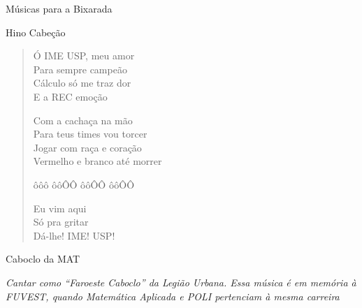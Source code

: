 \begin{secao}{Músicas para a Bixarada}

\begin{subsecao}{Hino Cabeção}
\begin{verse}

Ó IME USP, meu amor\\
Para sempre campeão\\
Cálculo só me traz dor\\
E a REC emoção

Com a cachaça na mão\\
Para teus times vou torcer\\
Jogar com raça e coração\\
Vermelho e branco até morrer

ôôô ôôÔÔ ôôÔÔ ôôÔÔ

Eu vim aqui\\
Só pra gritar\\
Dá-lhe! IME! USP!
\end{verse}
\end{subsecao}

\begin{subsecao}{Caboclo da MAT}

{\em Cantar como ``Faroeste Caboclo'' da Legião Urbana. Essa música é em memória 
à FUVEST, quando Matemática Aplicada e POLI pertenciam à mesma carreira}


\end{subsecao}
\end{secao}
